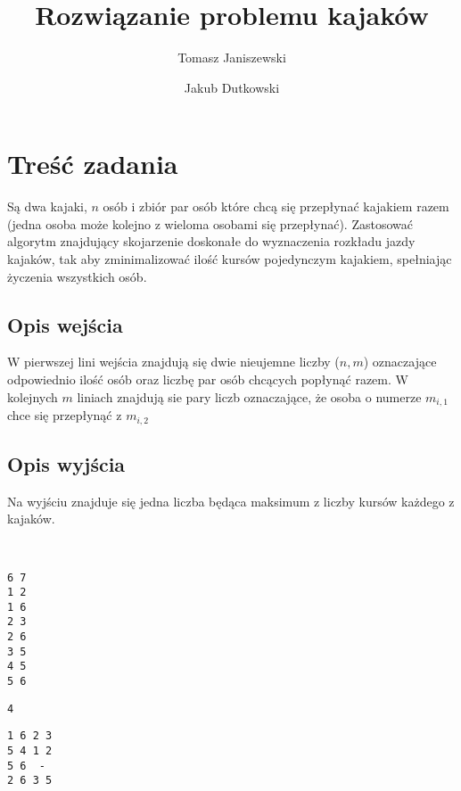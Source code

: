 \documentclass{llncs}
\begin{document}
\title{Rozwiązanie problemu kajaków}
%
%
\author{Tomasz Janiszewski \and Jakub Dutkowski}
%
%


\maketitle              %

%
\section{Treść zadania}
Są dwa kajaki, $n$ osób i zbiór par osób które chcą się
przepłynać kajakiem razem (jedna osoba może kolejno z wieloma osobami się
przepłynać). Zastosować algorytm znajdujący skojarzenie doskonałe do
wyznaczenia rozkładu jazdy kajaków, tak aby zminimalizować ilość kursów
pojedynczym kajakiem, spełniając życzenia wszystkich osób.

\subsection{Opis wejścia}
W pierwszej lini wejścia znajdują się dwie nieujemne liczby ($n, m$) oznaczające odpowiednio
ilość osób oraz liczbę par osób chcących popłynąć razem.
W kolejnych $m$ liniach znajdują sie pary liczb oznaczające, że osoba o numerze $m_{i,1}$ chce się
przepłynąć z $m_{i,2}$

\subsection{Opis wyjścia}
Na wyjściu znajduje się jedna liczba będąca maksimum z liczby kursów każdego z kajaków.


\begin{example} \label{przyklad} ~\\
\begin{lstlisting}[title=Wejście]
6 7
1 2
1 6
2 3
2 6
3 5
4 5
5 6
\end{lstlisting}
\begin{lstlisting}[title=Wyjście]
4
\end{lstlisting}

\begin{lstlisting}[title=Przykładowy rozkład plywania]
1 6	2 3
5 4	1 2
5 6	 -
2 6	3 5
\end{lstlisting}

\end{example}
\end{document}
